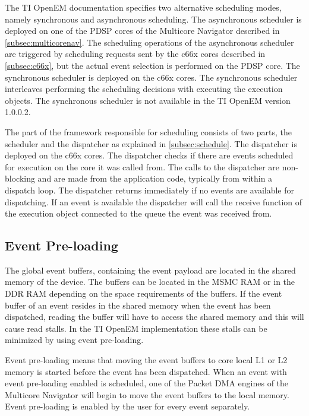 The TI OpenEM documentation specifies two alternative scheduling modes, namely synchronous and asynchronous scheduling. The asynchronous scheduler is deployed on one of the PDSP cores of the Multicore Navigator described in \ref{subsec:multicorenav}. The scheduling operations of the asynchronous scheduler are triggered by scheduling requests sent by the c66x cores described in \ref{subsec:c66x}, but the actual event selection is performed on the PDSP core. The synchronous scheduler is deployed on the c66x cores. The synchronous scheduler interleaves performing the scheduling decisions with executing the execution objects. The synchronous scheduler is not available in the TI OpenEM version 1.0.0.2.~\cite{openemwhite}

The part of the framework responsible for scheduling consists of two parts, the scheduler and the dispatcher as explained in \ref{subsec:schedule}. The dispatcher is deployed on the c66x cores. The dispatcher checks if there are events scheduled for execution on the core it was called from. The calls to the dispatcher are non-blocking and are made from the application code, typically from within a dispatch loop. The dispatcher returns immediately if no events are available for dispatching. If an event is available the dispatcher will call the receive function of the execution object connected to the queue the event was received from.~\cite{openemwhite}

\subsection{Event Pre-loading}
\label{subsec:ti-preloading}
The global event buffers, containing the event payload are located in the shared memory of the device. The buffers can be located in the MSMC RAM or in the DDR RAM depending on the space requirements of the buffers. If the event buffer of an event resides in the shared memory when the event has been dispatched, reading the buffer will have to access the shared memory and this will cause read stalls. In the TI OpenEM implementation these stalls can be minimized by using event pre-loading.~\cite{openemwhite}

Event pre-loading means that moving the event buffers to core local L1 or L2 memory is started before the event has been dispatched. When an event with event pre-loading enabled is scheduled, one of the Packet DMA engines of the Multicore Navigator will begin to move the event buffers to the local memory. Event pre-loading is enabled by the user for every event separately.~\cite{openemwhite}

